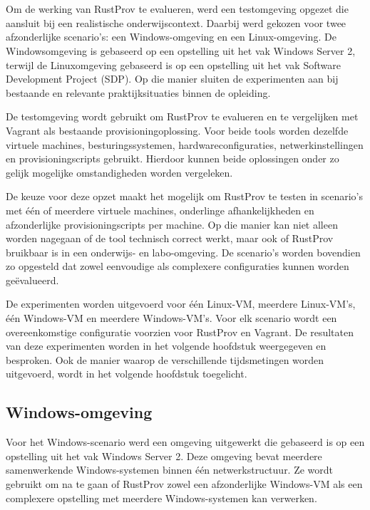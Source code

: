 \chapter{}%
\label{ch:experimentopzet}

Om de werking van RustProv te evalueren, werd een testomgeving opgezet die aansluit bij een realistische onderwijscontext. Daarbij werd gekozen voor twee afzonderlijke scenario's: een Windows-omgeving en een Linux-omgeving. De Windowsomgeving is gebaseerd op een opstelling uit het vak Windows Server 2, terwijl de Linuxomgeving gebaseerd is op een opstelling uit het vak Software Development Project (SDP). Op die manier sluiten de experimenten aan bij bestaande en relevante praktijksituaties binnen de opleiding.

De testomgeving wordt gebruikt om RustProv te evalueren en te vergelijken met Vagrant als bestaande provisioningoplossing. Voor beide tools worden dezelfde virtuele machines, besturingssystemen, hardwareconfiguraties, netwerkinstellingen en provisioningscripts gebruikt. Hierdoor kunnen beide oplossingen onder zo gelijk mogelijke omstandigheden worden vergeleken.

De keuze voor deze opzet maakt het mogelijk om RustProv te testen in scenario's met één of meerdere virtuele machines, onderlinge afhankelijkheden en afzonderlijke provisioningscripts per machine. Op die manier kan niet alleen worden nagegaan of de tool technisch correct werkt, maar ook of RustProv bruikbaar is in een onderwijs- en labo-omgeving. De scenario's worden bovendien zo opgesteld dat zowel eenvoudige als complexere configuraties kunnen worden geëvalueerd.

De experimenten worden uitgevoerd voor één Linux-VM, meerdere Linux-VM's, één Windows-VM en meerdere Windows-VM's. Voor elk scenario wordt een overeenkomstige configuratie voorzien voor RustProv en Vagrant. De resultaten van deze experimenten worden in het volgende hoofdstuk weergegeven en besproken. Ook de manier waarop de verschillende tijdsmetingen worden uitgevoerd, wordt in het volgende hoofdstuk toegelicht.

\section{Windows-omgeving}

Voor het Windows-scenario werd een omgeving uitgewerkt die gebaseerd is op een opstelling uit het vak Windows Server 2. Deze omgeving bevat meerdere samenwerkende Windows-systemen binnen één netwerkstructuur. Ze wordt gebruikt om na te gaan of RustProv zowel een afzonderlijke Windows-VM als een complexere opstelling met meerdere Windows-systemen kan verwerken.

